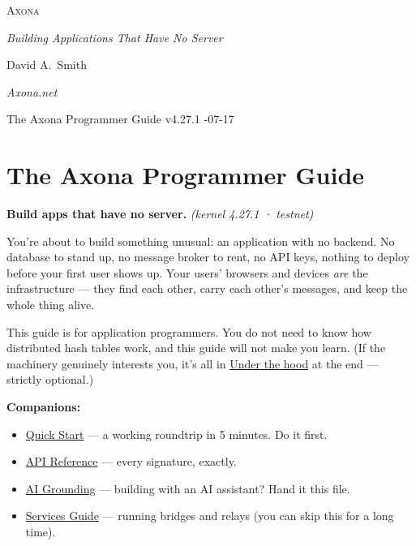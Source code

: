 \documentclass[
  nobib]{tufte-handout}
\author{}
\date{}
\providecommand{\tightlist}{%
  \setlength{\itemsep}{0pt}\setlength{\parskip}{0pt}}
\begin{document}
\thispagestyle{empty}
\null\vfill
\begin{center}
{\fontsize{48}{52}\selectfont \textsc{Axona}\par}
\vspace{0.6em}
{\Large\itshape Building Applications That Have No Server\par}
\vspace{4em}
{\large David A.~Smith\par}
{\itshape\small Axona.net\par}
\vspace{2em}
{\small The Axona Programmer Guide \quad v4.27.1 -07-17\par}
\end{center}
\vfill
\null
\newpage
\pagestyle{ndhtplain}
\thispagestyle{ndhtplain}
\setcounter{page}{1}

\section{The Axona Programmer Guide}\label{the-axona-programmer-guide}

\textbf{Build apps that have no server.} \emph{(kernel 4.27.1 ·
testnet)}

You're about to build something unusual: an application with no backend.
No database to stand up, no message broker to rent, no API keys, nothing
to deploy before your first user shows up. Your users' browsers and
devices \emph{are} the infrastructure --- they find each other, carry
each other's messages, and keep the whole thing alive.

This guide is for application programmers. You do not need to know how
distributed hash tables work, and this guide will not make you learn.
(If the machinery genuinely interests you, it's all in
\hyperref[9-under-the-hood--optional]{Under the hood} at the end ---
strictly optional.)

\textbf{Companions:}

\begin{itemize}
\tightlist
\item
  \href{Quick-Start-v4.27.1.md}{Quick Start} --- a working roundtrip in
  5 minutes. Do it first.
\item
  \href{Axona-API-Reference-v4.27.1.md}{API Reference} --- every
  signature, exactly.
\item
  \href{Axona-AI-Grounding-v4.27.1.md}{AI Grounding} --- building with
  an AI assistant? Hand it this file.
\item
  \href{Axona-Services-Guide-v4.27.1.md}{Services Guide} --- running
  bridges and relays (you can skip this for a long time).
\end{itemize}
\end{document}
